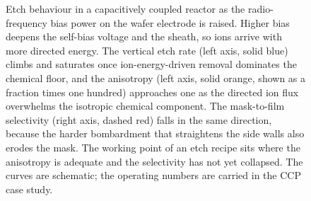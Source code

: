 \begin{figure}[htbp]
\centering
{}
\caption[Etch behaviour versus RF bias power]{Etch behaviour in a
capacitively coupled reactor as the radio-frequency bias power on the wafer
electrode is raised. Higher bias deepens the self-bias voltage and the
sheath, so ions arrive with more directed energy. The vertical etch rate
(left axis, solid blue) climbs and saturates once ion-energy-driven removal
dominates the chemical floor, and the anisotropy (left axis, solid orange,
shown as a fraction times one hundred) approaches one as the directed ion
flux overwhelms the isotropic chemical component. The mask-to-film
selectivity (right axis, dashed red) falls in the same direction, because
the harder bombardment that straightens the side walls also erodes the
mask. The working point of an etch recipe sits where the anisotropy is
adequate and the selectivity has not yet collapsed. The curves are
schematic; the operating numbers are carried in the CCP case study.}
\label{fig:vol04ch13:etch-bias}
\end{figure}
